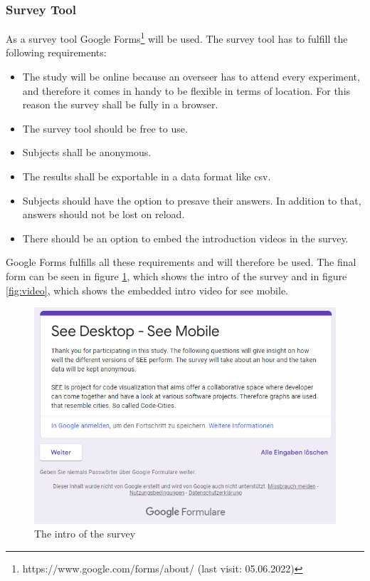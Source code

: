\subsubsection{Survey Tool}
\label{survey}
As a survey tool Google Forms\footnote{https://www.google.com/forms/about/ (last visit: 05.06.2022)} will be used.
The survey tool has to fulfill the following requirements: 
\begin{itemize}
  \item The study will be online because an overseer has to attend every experiment, and therefore it comes in handy to be flexible in terms of location. For this reason the survey shall be fully in a browser. 
  \item The survey tool should be free to use.
  \item Subjects shall be anonymous.
  \item The results shall be exportable in a data format like \gls{csv}.
  \item Subjects should have the option to presave their answers. In addition to that, answers should not be lost on reload.
  \item There should be an option to embed the introduction videos in the survey.
\end{itemize}

Google Forms fulfills all these requirements and will therefore be used. 
The final form can be seen in figure \ref{fig:intro}, which shows the intro of the survey and in figure \ref{fig:video}, which shows the embedded intro video for \gls{see} mobile.
\begin{figure}[H]
  \centering
  \includegraphics[width=1\textwidth]{Evaluation/img/form_intro.png}
  \caption{The intro of the survey}\label{fig:intro}
\end{figure}

